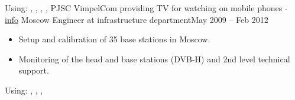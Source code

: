 Using: , , , , 
\horizontalline
% 
\ressubheading
{PJSC VimpelCom}
{providing TV for watching on mobile phones - \href{https://www.dvb.org/news/russia-to-launch-dvb-h-services}{info}}
{Moscow}
{Engineer at infrastructure department}{May 2009 -- Feb 2012}
\begin{itemize}
    \item Setup and calibration of 35 base stations in Moscow.
    \item Monitoring of the head and base stations (DVB-H) and 2nd level technical support.
\end{itemize}
Using: , , , 

